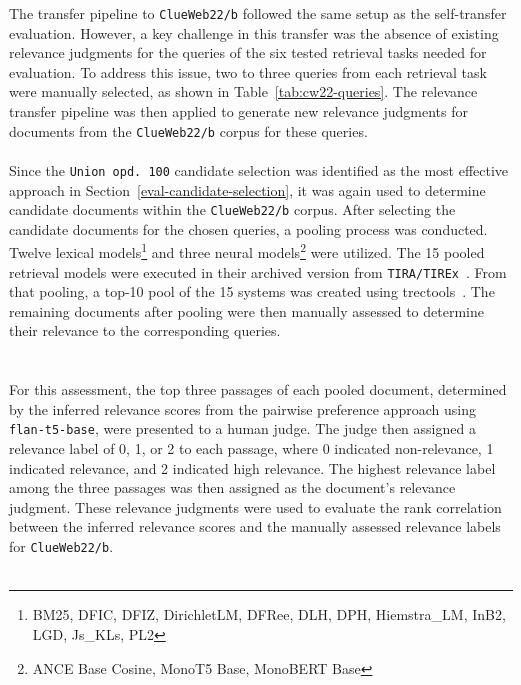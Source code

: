 The transfer pipeline to \texttt{ClueWeb22/b} followed the same setup as the self-transfer evaluation. However, a key challenge in this transfer was the absence of existing relevance judgments for the queries of the six tested retrieval tasks needed for evaluation. To address this issue, two to three queries from each retrieval task were manually selected, as shown in Table~\ref{tab:cw22-queries}. The relevance transfer pipeline was then applied to generate new relevance judgments for documents from the \texttt{ClueWeb22/b} corpus for these queries.
\\\\
Since the \texttt{Union opd.\ 100} candidate selection was identified as the most effective approach in Section~\ref{eval-candidate-selection}, it was again used to determine candidate documents within the \texttt{ClueWeb22/b} corpus. After selecting the candidate documents for the chosen queries, a pooling process was conducted. Twelve lexical models\footnote{\scriptsize BM25, DFIC, DFIZ, DirichletLM, DFRee, DLH, DPH, Hiemstra\_LM, InB2, LGD, Js\_KLs, PL2} and three neural models\footnote{\scriptsize ANCE Base Cosine, MonoT5 Base, MonoBERT Base} were utilized. The 15 pooled retrieval models were executed in their archived version from \texttt{TIRA/TIREx}~\citep{froebe:2023b,froebe:2023c}. From that pooling, a top-10 pool of the 15 systems was created using trectools~\citep{palotti:2019}. The remaining documents after pooling were then manually assessed to determine their relevance to the corresponding queries.
\\\\\\
For this assessment, the top three passages of each pooled document, determined by the inferred relevance scores from the pairwise preference approach using \texttt{flan-t5-base}, were presented to a human judge. The judge then assigned a relevance label of 0, 1, or 2 to each passage, where 0 indicated non-relevance, 1 indicated relevance, and 2 indicated high relevance. The highest relevance label among the three passages was then assigned as the document's relevance judgment. These relevance judgments were used to evaluate the rank correlation between the inferred relevance scores and the manually assessed \mbox{relevance} labels for \texttt{ClueWeb22/b}.
\\\\
